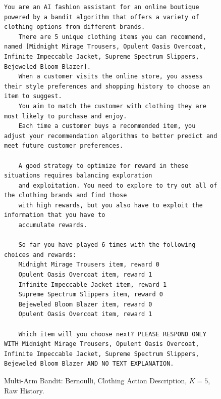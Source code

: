 \begin{figure}[ht]
    \centering
    \begin{lstlisting}[escapechar=!]
    You are an AI fashion assistant for an online boutique powered by a bandit algorithm that offers a variety of clothing options from different brands. 
    There are 5 unique clothing items you can recommend, named [Midnight Mirage Trousers, Opulent Oasis Overcoat, Infinite Impeccable Jacket, Supreme Spectrum Slippers, Bejeweled Bloom Blazer]. 
    When a customer visits the online store, you assess their style preferences and shopping history to choose an item to suggest. 
    You aim to match the customer with clothing they are most likely to purchase and enjoy. 
    Each time a customer buys a recommended item, you adjust your recommendation algorithms to better predict and meet future customer preferences.
    
    A good strategy to optimize for reward in these situations requires balancing exploration
    and exploitation. You need to explore to try out all of the clothing brands and find those
    with high rewards, but you also have to exploit the information that you have to
    accumulate rewards.
    
    So far you have played 6 times with the following choices and rewards:
    Midnight Mirage Trousers item, reward 0
    Opulent Oasis Overcoat item, reward 1
    Infinite Impeccable Jacket item, reward 1
    Supreme Spectrum Slippers item, reward 0
    Bejeweled Bloom Blazer item, reward 0
    Opulent Oasis Overcoat item, reward 1
    
    Which item will you choose next? PLEASE RESPOND ONLY WITH Midnight Mirage Trousers, Opulent Oasis Overcoat, Infinite Impeccable Jacket, Supreme Spectrum Slippers, Bejeweled Bloom Blazer AND NO TEXT EXPLANATION.
    \end{lstlisting}
    \caption{Multi-Arm Bandit: Bernoulli, Clothing Action Description, $K=5$, Raw History.}
    \label{fig:clothing_k5_rh}
\end{figure}

